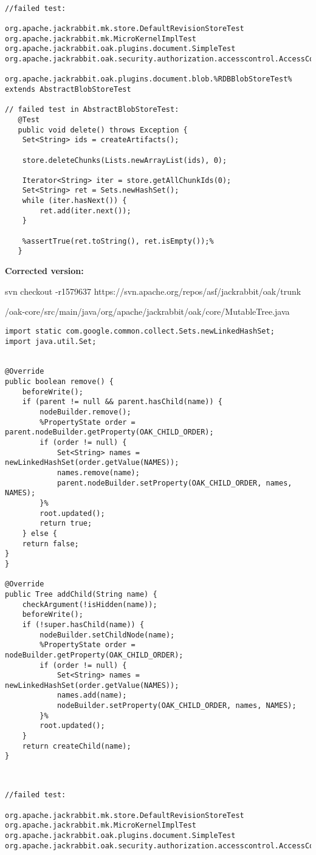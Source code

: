 \documentclass{article}
\begin{document}
\begin{lstlisting}[frame=single]

//failed test:

org.apache.jackrabbit.mk.store.DefaultRevisionStoreTest
org.apache.jackrabbit.mk.MicroKernelImplTest
org.apache.jackrabbit.oak.plugins.document.SimpleTest
org.apache.jackrabbit.oak.security.authorization.accesscontrol.AccessControlManagerImplTest

org.apache.jackrabbit.oak.plugins.document.blob.%RDBBlobStoreTest% extends AbstractBlobStoreTest

// failed test in AbstractBlobStoreTest:
   @Test
   public void delete() throws Exception {
   	Set<String> ids = createArtifacts();
   	
   	store.deleteChunks(Lists.newArrayList(ids), 0);
   	
   	Iterator<String> iter = store.getAllChunkIds(0);
   	Set<String> ret = Sets.newHashSet();
   	while (iter.hasNext()) {
   		ret.add(iter.next());
   	}
   	
   	%assertTrue(ret.toString(), ret.isEmpty());%
   }

\end{lstlisting}
\clearpage
\textbf{Corrected version:}

svn checkout -r1579637 https://svn.apache.org/repos/asf/jackrabbit/oak/trunk

/oak-core/src/main/java/org/apache/jackrabbit/oak/core/MutableTree.java

\begin{lstlisting}[frame=single]
import static com.google.common.collect.Sets.newLinkedHashSet;
import java.util.Set;


@Override
public boolean remove() {
	beforeWrite();
	if (parent != null && parent.hasChild(name)) {
		nodeBuilder.remove();
		%PropertyState order = parent.nodeBuilder.getProperty(OAK_CHILD_ORDER);
		if (order != null) {
			Set<String> names = newLinkedHashSet(order.getValue(NAMES));
			names.remove(name);
			parent.nodeBuilder.setProperty(OAK_CHILD_ORDER, names, NAMES);
		}%
		root.updated();
		return true;
	} else {
	return false;
}
}

@Override
public Tree addChild(String name) {
	checkArgument(!isHidden(name));
	beforeWrite();
	if (!super.hasChild(name)) {
		nodeBuilder.setChildNode(name);
		%PropertyState order = nodeBuilder.getProperty(OAK_CHILD_ORDER);
		if (order != null) {
			Set<String> names = newLinkedHashSet(order.getValue(NAMES));
			names.add(name);
			nodeBuilder.setProperty(OAK_CHILD_ORDER, names, NAMES);
		}%
		root.updated();
	}
	return createChild(name);
}

\end{lstlisting}
\begin{lstlisting}[frame=single]


//failed test:

org.apache.jackrabbit.mk.store.DefaultRevisionStoreTest
org.apache.jackrabbit.mk.MicroKernelImplTest
org.apache.jackrabbit.oak.plugins.document.SimpleTest
org.apache.jackrabbit.oak.security.authorization.accesscontrol.AccessControlManagerImplTest


\end{lstlisting}
\end{document}

